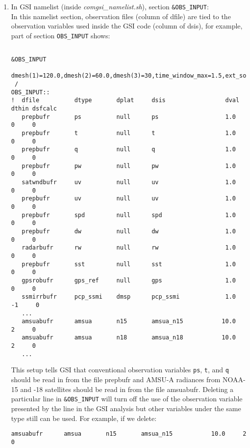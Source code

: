 \begin{enumerate}[leftmargin=*]
\item In GSI namelist (inside \textit{comgsi\_namelist.sh}), section \verb|&OBS_INPUT|:\\

In this namelist section, observation files (column of dfile) are tied to the observation variables used inside the GSI code (column of dsis), for example, part of section \verb|OBS_INPUT| shows:

\begin{scriptsize}
\begin{verbatim}

&OBS_INPUT
   dmesh(1)=120.0,dmesh(2)=60.0,dmesh(3)=30,time_window_max=1.5,ext_sonde=.true.,
 /
OBS_INPUT::
!  dfile          dtype       dplat     dsis                 dval    dthin dsfcalc
   prepbufr       ps          null      ps                   1.0     0     0
   prepbufr       t           null      t                    1.0     0     0
   prepbufr       q           null      q                    1.0     0     0
   prepbufr       pw          null      pw                   1.0     0     0
   satwndbufr     uv          null      uv                   1.0     0     0
   prepbufr       uv          null      uv                   1.0     0     0
   prepbufr       spd         null      spd                  1.0     0     0
   prepbufr       dw          null      dw                   1.0     0     0
   radarbufr      rw          null      rw                   1.0     0     0
   prepbufr       sst         null      sst                  1.0     0     0
   gpsrobufr      gps_ref     null      gps                  1.0     0     0
   ssmirrbufr     pcp_ssmi    dmsp      pcp_ssmi             1.0    -1     0
   ...
   amsuabufr      amsua       n15       amsua_n15           10.0     2     0
   amsuabufr      amsua       n18       amsua_n18           10.0     2     0
   ...
\end{verbatim}
\end{scriptsize}

This setup tells GSI that conventional observation variables \verb|ps|, \verb|t|, and \verb|q| should be read in from the file prepbufr and AMSU-A radiances from NOAA-15 and -18 satellites should be read in from the file amsuabufr. Deleting a particular line in \verb|&OBS_INPUT| will turn off the use of the observation variable presented by the line in the GSI analysis but other variables under the same type still can be used. For example, if we delete: 

\begin{scriptsize}
\begin{verbatim}
amsuabufr      amsua       n15       amsua_n15           10.0     2     0
\end{verbatim}
\end{scriptsize}


\end{enumerate}
